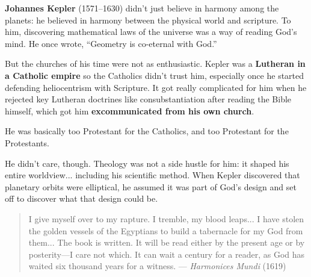 \begin{tcolorbox}[colback=blue!5!white, colframe=blue!50!black, title=Historical Sidebar: Kepler’s Theology—Excommunicated From All Sides]

  \textbf{Johannes Kepler} (1571–1630) didn’t just believe in harmony among the planets: he believed in harmony between the physical world and scripture. To him, discovering mathematical laws of the universe was a way of reading God’s mind. He once wrote, ``Geometry is co-eternal with God.''

  \medskip

  But the churches of his time were not as enthusiastic.  Kepler was a \textbf{Lutheran in a Catholic empire} so the Catholics didn’t trust him, especially once he started defending heliocentrism with Scripture. It got really complicated for him when he rejected key Lutheran doctrines like consubstantiation after reading the Bible himself, which got him \textbf{excommunicated from his own church}.  

  \medskip
  
  He was basically too Protestant for the Catholics, and too Protestant for the Protestants.

  \medskip

  He didn't care, though. Theology was not a side hustle for him: it shaped his entire worldview... including his scientific method. When Kepler discovered that planetary orbits were elliptical, he assumed it was part of God’s design and set off to discover what that design could be.


  \begin{quote}
  I give myself over to my rapture. I tremble, my blood leaps... I have stolen the golden vessels of the Egyptians to build a tabernacle for my God from them... The book is written. It will be read either by the present age or by posterity—I care not which. It can wait a century for a reader, as God has waited six thousand years for a witness.
  --- \textit{Harmonices Mundi} (1619)
  \end{quote}


\end{tcolorbox}


